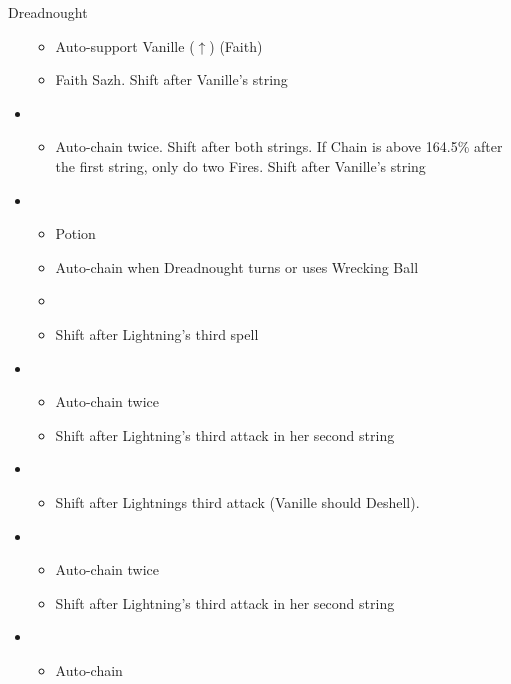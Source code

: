 \begin{paracol}{2}
\begin{battle}{Dreadnought}
\begin{itemize}
\begin{itemize}
				      \item Auto-support Vanille ($\uparrow$) (Faith)
				      \item Faith Sazh. Shift after Vanille's string
			      \end{itemize}
			\item \fifth
			      \begin{itemize}
				      \item Auto-chain twice. Shift after both strings. If Chain is above 164.5\% after the first string, only do two Fires. Shift after Vanille's string
			      \end{itemize}
			\item \fourth
			      \begin{itemize}
				      \item Potion
				      \item Auto-chain when Dreadnought turns or uses Wrecking Ball
				      \item \stagger
				      \item Shift after Lightning's third spell
			      \end{itemize}
			\item \first
			      \begin{itemize}
				      \item Auto-chain twice
				      \item Shift after Lightning's third attack in her second string
			      \end{itemize}
			\item \second
			      \begin{itemize}
				      \item Shift after Lightnings third attack (Vanille should Deshell).
			      \end{itemize}
			\item \first
			      \begin{itemize}
				      \item Auto-chain twice
				      \item Shift after Lightning's third attack in her second string
			      \end{itemize}
			\item \third
			      \begin{itemize}
				      \item Auto-chain
			      \end{itemize}
		\end{itemize}
	\end{battle}
	\begin{menu}

\end{menu}
\end{paracol}
